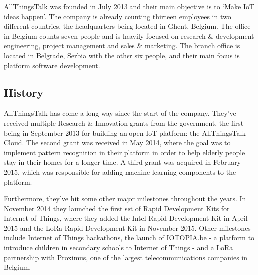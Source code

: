 \documentclass[pdftex,a4paper,12pt,twoside]{report}
\begin{document}
AllThingsTalk was founded in July 2013 and their main objective is to `Make IoT ideas happen'. The company is already counting thirteen employees in two different countries, the headquarters being located in Ghent, Belgium. The office in Belgium counts seven people and is heavily focused on research \& development engineering, project management and sales \& marketing. The branch office is located in Belgrade, Serbia with the other six people, and their main focus is platform software development.

\subsection{History}
\label{subsec:atthistory}
AllThingsTalk has come a long way since the start of the company. They've received multiple Research \& Innovation grants from the government, the first being in September 2013 for building an open IoT platform: the AllThingsTalk Cloud. The second grant was received in May 2014, where the goal was to implement pattern recognition in their platform in order to help elderly people stay in their homes for a longer time. A third grant was acquired in February 2015, which was responsible for adding machine learning components to the platform.

Furthermore, they've hit some other major milestones throughout the years. In November 2014 they launched the first set of Rapid Development Kits for Internet of Things, where they added the Intel Rapid Development Kit in April 2015 and the LoRa Rapid Development Kit in November 2015. Other milestones include Internet of Things hackathons, the launch of IOTOPIA.be - a platform to introduce children in secondary schools to Internet of Things - and a LoRa partnership with Proximus, one of the largest telecommunications companies in Belgium.

%
%
%
\end{document}
